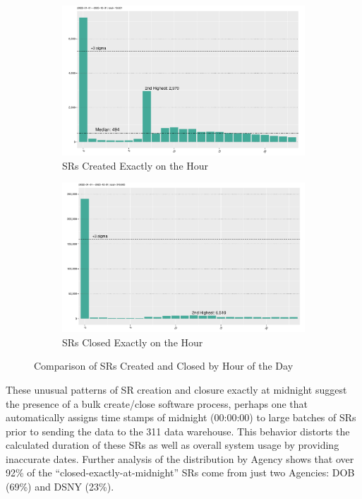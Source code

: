 \documentclass[linenumber]{jdsart}
\begin{document}
\begin{figure}[tbp]
    \centering
    \begin{subfigure}{\textwidth}
        \centering
        \includegraphics[width=\textwidth]{2-year-trend_SRs_created_on_the_hour.pdf}
        \caption{SRs Created Exactly on the Hour}
        \label{fig:busiestcreated}
    \end{subfigure}
    \par\medskip
    \begin{subfigure}{\textwidth}
        \centering
        \includegraphics[width=\textwidth]{2-year-trend_SRs_closed_on_the_hour.pdf}
        \caption{SRs Closed Exactly on the Hour}
        \label{fig:busiestclosed}
    \end{subfigure}
    \caption{Comparison of SRs Created and Closed by Hour of the Day}
    \label{fig:stacked}
\end{figure}

These unusual patterns of SR creation and closure exactly at midnight 
suggest the presence of a bulk create/close software process, perhaps one
that automatically assigns time stamps of midnight (00:00:00) to 
large batches of SRs prior to sending the data to the 311 
data warehouse. This behavior distorts the calculated duration of these 
SRs as well as overall system usage by providing inaccurate 
dates. Further analysis of the distribution by Agency shows that over 92\% of 
the ``closed-exactly-at-midnight'' SRs come from just two 
Agencies: DOB (69\%) and DSNY  (23\%).
\end{document}
